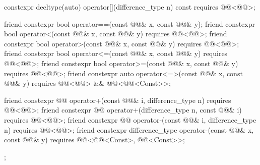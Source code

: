 \begin{codeblock}
{{    constexpr decltype(auto) operator[](difference_type n) const
      requires @@<@@>;

    friend constexpr bool operator==(const @@& x, const @@& y);
    friend constexpr bool operator<(const @@& x, const @@& y)
      requires @@<@@>;
    friend constexpr bool operator>(const @@& x, const @@& y)
      requires @@<@@>;
    friend constexpr bool operator<=(const @@& x, const @@& y)
      requires @@<@@>;
    friend constexpr bool operator>=(const @@& x, const @@& y)
      requires @@<@@>;
    friend constexpr auto operator<=>(const @@& x, const @@& y)
      requires @@<@@> && @@<@@<Const>>;

    friend constexpr @@ operator+(const @@& i, difference_type n)
      requires @@<@@>;
    friend constexpr @@ operator+(difference_type n, const @@& i)
      requires @@<@@>;
    friend constexpr @@ operator-(const @@& i, difference_type n)
      requires @@<@@>;
    friend constexpr difference_type operator-(const @@& x, const @@& y)
      requires @@<@@<Const>, @@<Const>>;
  };
}
\end{codeblock}

